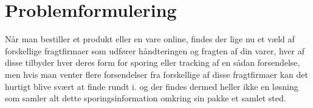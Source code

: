 \chapter{Problemformulering}
Når man bestiller et produkt eller en vare online, findes der lige nu et væld af forskellige fragtfirmaer som udfører håndteringen og fragten af din varer, hver af disse tilbyder hver deres form for sporing eller tracking af en sådan forsendelse, men hvis man venter flere forsendelser fra forskellige af disse fragtfirmaer kan det hurtigt blive svært at finde rundt i. og der findes dermed heller ikke en løsning som samler alt dette sporingsinformation omkring sin pakke et samlet sted.